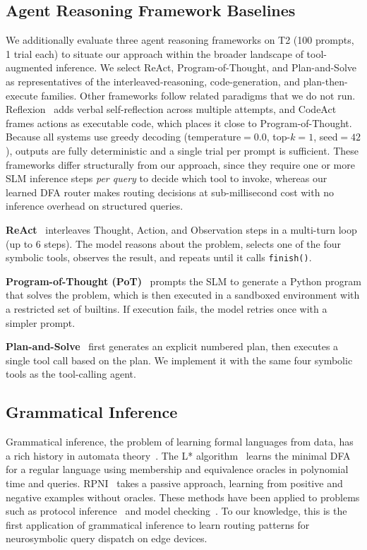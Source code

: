 \documentclass[journal]{IEEEtai}
\begin{document}
\subsection{Agent Reasoning Framework Baselines}
\label{sec:agent_frameworks}

We additionally evaluate three agent reasoning frameworks on T2 (100 prompts, 1 trial each) to situate our approach within the broader landscape of tool-augmented inference. We select ReAct, Program-of-Thought, and Plan-and-Solve as representatives of the interleaved-reasoning, code-generation, and plan-then-execute families. Other frameworks follow related paradigms that we do not run. Reflexion~\cite{shinn2023reflexion} adds verbal self-reflection across multiple attempts, and CodeAct~\cite{wang2024codeact} frames actions as executable code, which places it close to Program-of-Thought. Because all systems use greedy decoding (temperature${}=0.0$, top-$k=1$, seed${}=42$), outputs are fully deterministic and a single trial per prompt is sufficient. These frameworks differ structurally from our approach, since they require one or more SLM inference steps \emph{per query} to decide which tool to invoke, whereas our learned DFA router makes routing decisions at sub-millisecond cost with no inference overhead on structured queries.


\textbf{ReAct}~\cite{yao2023react} interleaves Thought, Action, and Observation steps in a multi-turn loop (up to 6 steps). The model reasons about the problem, selects one of the four symbolic tools, observes the result, and repeats until it calls \texttt{finish()}.

\textbf{Program-of-Thought (PoT)}~\cite{chen2023pot} prompts the SLM to generate a Python program that solves the problem, which is then executed in a sandboxed environment with a restricted set of builtins. If execution fails, the model retries once with a simpler prompt.

\textbf{Plan-and-Solve}~\cite{wang2023plansolve} first generates an explicit numbered plan, then executes a single tool call based on the plan. We implement it with the same four symbolic tools as the tool-calling agent.

\subsection{Grammatical Inference}
Grammatical inference, the problem of learning formal languages from data, has a rich history in automata theory~\cite{gold1967language, higuera2010grammatical}. The L* algorithm~\cite{Angluin87} learns the minimal DFA for a regular language using membership and equivalence oracles in polynomial time and queries. RPNI~\cite{oncina1992rpni} takes a passive approach, learning from positive and negative examples without oracles. These methods have been applied to problems such as protocol inference~\cite{fiterau2020analysis} and model checking~\cite{peled2001model}. To our knowledge, this is the first application of grammatical inference to learn routing patterns for neurosymbolic query dispatch on edge devices.
\end{document}
